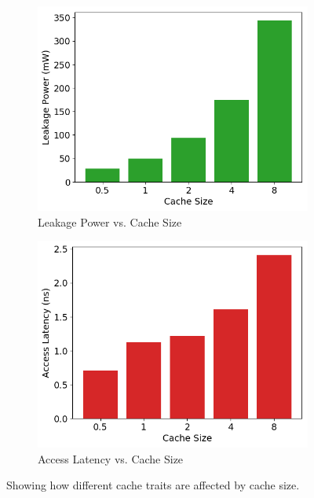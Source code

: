 \begin{figure}
\begin{subfigure}[b]{0.5\textwidth}
        \includegraphics[width=\textwidth]{CachePower.png}
        \caption{Leakage Power vs. Cache Size}
    \end{subfigure}
    \begin{subfigure}[b]{0.5\textwidth}
        \includegraphics[width=\textwidth]{CacheLatency.png}
        \caption{Access Latency vs. Cache Size}
    \end{subfigure}
    \caption[Tradeoffs of Cache Size]{Showing how different cache traits are affected by cache size.}
    \label{fig:CacheSize}
\end{figure}
